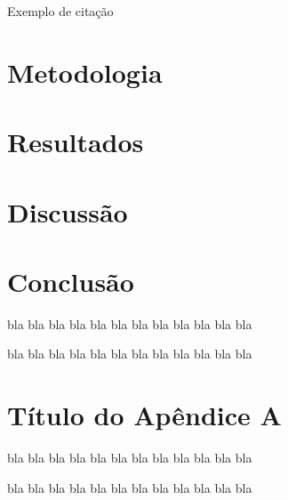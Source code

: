\documentclass[12pt,a4paper,espaco=umemeio,noindentfirst,oneside,openany,tocpage=plain,pnumromarab,ruledheader,time,anapcustomindent]{abntex2ppgsi}
\begin{document}
Exemplo de citação~\cite{Pressman:2006}


\chapter{Metodologia}


\chapter{Resultados}


\chapter{Discussão}


\chapter{Conclusão}

bla bla bla bla bla bla bla bla bla bla bla bla

bla bla bla bla bla bla bla bla bla bla bla bla







\appendix


\chapter{Título do Apêndice A}

bla bla bla bla bla bla bla bla bla bla bla bla

bla bla bla bla bla bla bla bla bla bla bla bla
\end{document}
